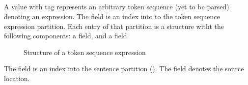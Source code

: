 





\subsection{}
\label{sec:ifc:ExprSort:Tokens}

A  value with tag  represents an arbitrary token sequence (yet to be parsed) denoting an expression. 
The  field is an index into to the token sequence expression partition.
Each entry of that partition is a structure witht the following components: a  field, and a  field.
%
\begin{figure}[H]
	\centering
	\caption{Structure of a token sequence expression}
	\label{fig:ifc-token-sequence-expression-structure}
\end{figure}
%
The  field is an index into the sentence partition ().
The  field denotes the source location.

